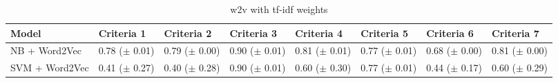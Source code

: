 \documentclass[a4paper,twoside,phd]{BYUPhys}
\begin{document}
\begin{table}[H]
	\centering
	\begin{tabular}{|p{1.7cm}|p{1.6cm}|p{1.6cm}|p{1.6cm}|p{1.6cm}|p{1.6cm}|p{1.6cm}|p{1.6cm}|}
		\hline
		Model & Criteria 1                                                                           & Criteria 2    & Criteria 3 & Criteria 4 & Criteria 5 & Criteria 6 & Criteria 7                                                                                                                                                                                                                                                                                                                                                          \\
		\hline                                                                                                                                              
		
		NB + Word2Vec  & 0.78 \newline ($\pm$ 0.01) & 0.79 \newline ($\pm$ 0.00) & 0.90 \newline ($\pm$ 0.01) & 0.81 \newline ($\pm$ 0.01) & 0.77 \newline ($\pm$ 0.01)  & 0.68 \newline ($\pm$ 0.00)   & 0.81 \newline ($\pm$ 0.00)  \\
		\hline
		
		SVM + Word2Vec  & 0.41 \newline ($\pm$ 0.27) & 0.40 \newline ($\pm$ 0.28) & 0.90 \newline ($\pm$ 0.01) & 0.60 \newline ($\pm$ 0.30) & 0.77 \newline ($\pm$ 0.01)  & 0.44 \newline ($\pm$ 0.17) & 0.60 \newline ($\pm$ 0.29)                                                                                                                                              \\
		\hline
		
	\end{tabular}
	\caption{w2v with tf-idf weights}
	\label{table:w2vtfidf}
\end{table}
\end{document}
